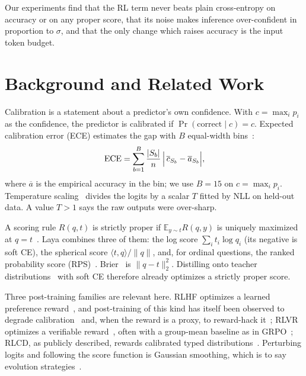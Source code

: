 \documentclass[conference]{IEEEtran}
\newcommand{\E}{\mathbb{E}}
\begin{document}
Our experiments find that the RL term never beats plain cross-entropy on
accuracy or on any proper score, that its noise makes inference over-confident
in proportion to $\sigma$, and that the only change which raises accuracy is
the input token budget.

\section{Background and Related Work}

Calibration is a statement about a predictor's own confidence. With
$c=\max_i p_i$ as the confidence, the predictor is calibrated if
$\Pr(\text{correct}\mid c)=c$. Expected calibration error (ECE) estimates the
gap with $B$ equal-width bins~\cite{naeini2015ece,guo2017calibration}:
\begin{equation}
\mathrm{ECE}=\sum_{b=1}^{B}\frac{|S_b|}{n}\,\Bigl|\,\overline{c}_{S_b}-\overline{a}_{S_b}\Bigr|,
\label{eq:ece}
\end{equation}
where $\overline{a}$ is the empirical accuracy in the bin; we use $B=15$ on
$c=\max_i p_i$. Temperature scaling~\cite{guo2017calibration} divides the
logits by a scalar $T$ fitted by NLL on held-out data. A value $T>1$ says the
raw outputs were over-sharp.

A scoring rule $R(q,t)$ is strictly proper if $\E_{y\sim t}R(q,y)$ is uniquely
maximized at $q=t$~\cite{gneiting2007scoring}. Laya combines three of them:
the log score $\sum_i t_i\log q_i$ (its negative is soft CE), the spherical
score $\langle t,q\rangle/\|q\|$, and, for ordinal questions, the ranked
probability score (RPS)~\cite{epstein1969rps}. Brier~\cite{brier1950} is
$\|q-t\|_2^2$. Distilling onto teacher distributions~\cite{hinton2015distilling}
with soft CE therefore already optimizes a strictly proper score.

Three post-training families are relevant here. RLHF optimizes a learned
preference reward~\cite{christiano2017rlhf,ouyang2022instructgpt}, and
post-training of this kind has itself been observed to degrade
calibration~\cite{kadavath2022language,openai2023gpt4} and, when the reward is
a proxy, to reward-hack it~\cite{gao2022overoptimization}; RLVR
optimizes a verifiable reward~\cite{lambert2024tulu3}, often with a group-mean
baseline as in GRPO~\cite{shao2024grpo}; RLCD, as publicly described, rewards
calibrated typed distributions~\cite{rlcd_explained}. Perturbing logits and
following the score function is Gaussian smoothing, which is to say evolution
strategies~\cite{salimans2017es,nesterov2017random,mohamed2020mcgrad}.
\end{document}
